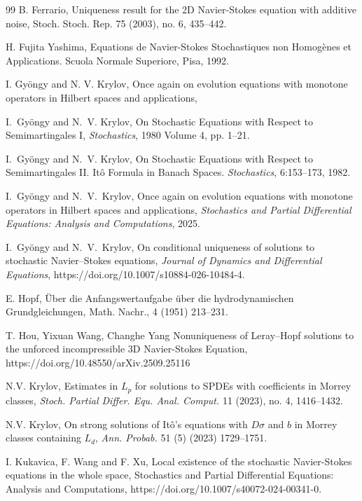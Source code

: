 \documentclass[11pt,reqno]{amsart}
\theoremstyle{definition}
\theoremstyle{remark}
\newcommand{\<}{\langle}
\renewcommand{\>}{\rangle}
\begin{document}
\begin{thebibliography}{99}
 B. Ferrario, Uniqueness result for 
the 2D Navier-Stokes 
equation with additive
noise, Stoch. Stoch. Rep. 75 (2003), no. 6, 435--442.

 H. Fujita Yashima, Equations de 
Navier-Stokes Stochastiques non Homogènes et Applications.
 Scuola Normale Superiore, Pisa, 1992.

 I. Gy\"ongy and N. V. Krylov, 
 Once again on evolution equations with monotone operators
in Hilbert spaces and applications, 

I.~Gy\"ongy and N.~V. Krylov,
On Stochastic Equations with Respect to Semimartingales I, 
{\em Stochastics}, 1980 Volume 4,  pp. 1--21. 

I.~Gy\"ongy and N.~V. Krylov,
On Stochastic Equations with Respect to Semimartingales II. It\^o Formula in Banach Spaces. 
{\em Stochastics}, 6:153--173, 1982. 

I.~Gy\"ongy and N.~V.~Krylov,
Once again on evolution equations with monotone operators in Hilbert spaces and applications,
{\em Stochastics and Partial Differential Equations: Analysis and Computations}, 2025.

I.~Gy\"ongy and N.~V.~Krylov,
On conditional uniqueness of solutions to stochastic Navier--Stokes equations,
{\em Journal of Dynamics and Differential Equations}, https://doi.org/10.1007/s10884-026-10484-4. 

 E. Hopf, \"Uber die Anfangswertaufgabe \"uber die 
hydrodynamischen Grundgleichungen, Math. Nachr., 4 (1951) 213--231. 

T. Hou, Yixuan Wang, Changhe Yang
Nonuniqueness of Leray–Hopf solutions to the unforced incompressible 3D Navier-Stokes Equation, 
https://doi.org/10.48550/arXiv.2509.25116
 
 N.V. Krylov, Estimates in $L_p$ 
for solutions to SPDEs with coefficients 
in Morrey classes, {\em Stoch. Partial Differ. Equ. Anal. Comput.} 
11 (2023), no. 4, 1416--1432. 

  N.V. Krylov, On strong solutions of It\^o's equations 
with $D\sigma$ and $b$ in Morrey classes containing 
$L_{d}$, {\it Ann. Probab.} 51 (5) (2023) 1729--1751.

 
 I. Kukavica, F. Wang  and F. Xu, 
Local existence of the stochastic Navier-Stokes equations in the whole space, 
Stochastics and Partial Differential 
Equations: Analysis and Computations,  
https://doi.org/10.1007/s40072-024-00341-0. 


\end{thebibliography}
\end{document}
